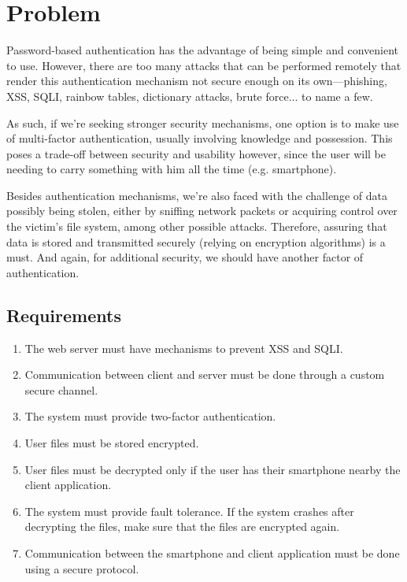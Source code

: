 \documentclass[12pt]{article}
\begin{document}

\newpage

\section{Problem}
    
Password-based authentication has the advantage of being simple and convenient to use. However, there are too many attacks that can be performed remotely that render this authentication mechanism not secure enough on its own---phishing, XSS, SQLI, rainbow tables, dictionary attacks, brute force... to name a few.\par

As such, if we're seeking stronger security mechanisms, one option is to make use of multi-factor authentication, usually involving knowledge and possession. This poses a trade-off between security and usability however, since the user will be needing to carry something with him all the time (e.g. smartphone).\par

Besides authentication mechanisms, we're also faced with the challenge of data possibly being stolen, either by sniffing network packets or acquiring control over the victim's file system, among other possible attacks. Therefore, assuring that data is stored and transmitted securely (relying on encryption algorithms) is a must. And again, for additional security, we should have another factor of authentication.\par

\subsection{Requirements}

\begin{enumerate}
  \item The web server must have mechanisms to prevent XSS and SQLI.
  \item Communication between client and server must be done through a custom secure channel.
  \item The system must provide two-factor authentication.
  \item User files must be stored encrypted.
  \item User files must be decrypted only if the user has their smartphone nearby the client application.
  \item The system must provide fault tolerance. If the system crashes after decrypting the files, make sure that the files are encrypted again.
  \item Communication between the smartphone and client application must be done using a secure protocol.
  
\end{enumerate}
\end{document}
